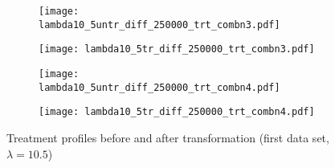 \documentclass[11pt]{article}
\begin{document}
\begin{figure}
  \ContinuedFloat 
\begin{subfigure}{.5\textwidth}
  \centering
  \texttt{[image: lambda10\_5untr\_diff\_250000\_trt\_combn3.pdf]}
  \caption{}
  \label{data1prrofe}
\end{subfigure}%
\begin{subfigure}{.5\textwidth}
  \centering
  \texttt{[image: lambda10\_5tr\_diff\_250000\_trt\_combn3.pdf]}
  \caption{}
  \label{data1prroff}
\end{subfigure}
\begin{subfigure}{.5\textwidth}
  \centering
  \texttt{[image: lambda10\_5untr\_diff\_250000\_trt\_combn4.pdf]}
  \caption{}
  \label{data1prrofg}
\end{subfigure}%
\begin{subfigure}{.5\textwidth}
  \centering
  \texttt{[image: lambda10\_5tr\_diff\_250000\_trt\_combn4.pdf]}
  \caption{}
  \label{data1prrofh}
\end{subfigure}
\caption{Treatment profiles before and after transformation (first data set, $\lambda = 10.5$)}
\label{data1prrof}
\end{figure}
\end{document}
